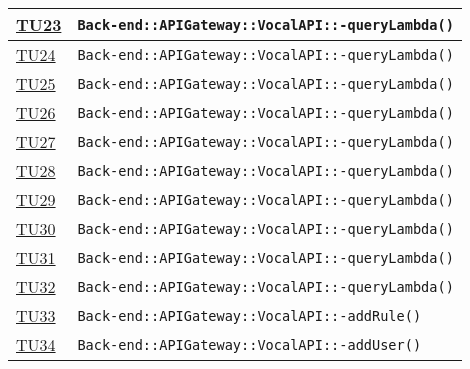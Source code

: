 \begin{longtable}{|>{\centering}m{1cm}|m{12cm}<{\centering}|}
\hyperlink{TU23}{TU23} & \texttt{Back-end::APIGateway::VocalAPI::-\linebreak queryLambda()}\\ \hline

\hyperlink{TU24}{TU24} & \texttt{Back-end::APIGateway::VocalAPI::-\linebreak queryLambda()}\\ \hline

\hyperlink{TU25}{TU25} & \texttt{Back-end::APIGateway::VocalAPI::-\linebreak queryLambda()}\\ \hline

\hyperlink{TU26}{TU26} & \texttt{Back-end::APIGateway::VocalAPI::-\linebreak queryLambda()}\\ \hline

\hyperlink{TU27}{TU27} & \texttt{Back-end::APIGateway::VocalAPI::-\linebreak queryLambda()}\\ \hline

\hyperlink{TU28}{TU28} & \texttt{Back-end::APIGateway::VocalAPI::-\linebreak queryLambda()}\\ \hline

\hyperlink{TU29}{TU29} & \texttt{Back-end::APIGateway::VocalAPI::-\linebreak queryLambda()}\\ \hline

\hyperlink{TU30}{TU30} & \texttt{Back-end::APIGateway::VocalAPI::-\linebreak queryLambda()}\\ \hline

\hyperlink{TU31}{TU31} & \texttt{Back-end::APIGateway::VocalAPI::-\linebreak queryLambda()}\\ \hline

\hyperlink{TU32}{TU32} & \texttt{Back-end::APIGateway::VocalAPI::-\linebreak queryLambda()}\\ \hline

\hyperlink{TU33}{TU33} & \texttt{Back-end::APIGateway::VocalAPI::-\linebreak addRule()}\\ \hline

\hyperlink{TU34}{TU34} & \texttt{Back-end::APIGateway::VocalAPI::-\linebreak addUser()}\\ \hline


\end{longtable}

